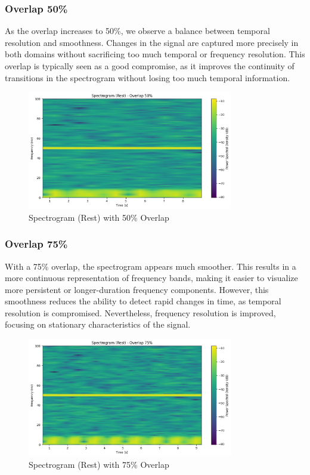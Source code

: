 \documentclass[10pt]{article}
\theoremstyle{definition}
\theoremstyle{remark}
\theoremstyle{definition}
\numberwithin{equation}{prob}
\begin{document}
\subsubsection{Overlap 50\%}
As the overlap increases to 50\%, we observe a balance between temporal resolution and smoothness. Changes in the signal are captured more precisely in both domains without sacrificing too much temporal or frequency resolution. This overlap is typically seen as a good compromise, as it improves the continuity of transitions in the spectrogram without losing too much temporal information.

\begin{figure}[H]
    \centering
    \includegraphics[width=0.8\textwidth]{./figures/Spectrogram Rest Overlap 50.png}
    \caption{Spectrogram (Rest) with 50\% Overlap}
    \label{fig:rest_50_overlap}
\end{figure}

\subsubsection{Overlap 75\%}
With a 75\% overlap, the spectrogram appears much smoother. This results in a more continuous representation of frequency bands, making it easier to visualize more persistent or longer-duration frequency components. However, this smoothness reduces the ability to detect rapid changes in time, as temporal resolution is compromised. Nevertheless, frequency resolution is improved, focusing on stationary characteristics of the signal.

\begin{figure}[H]
    \centering
    \includegraphics[width=0.8\textwidth]{./figures/Spectrogram Rest Overlap 75.png}
    \caption{Spectrogram (Rest) with 75\% Overlap}
    \label{fig:rest_75_overlap}
\end{figure}
\end{document}
